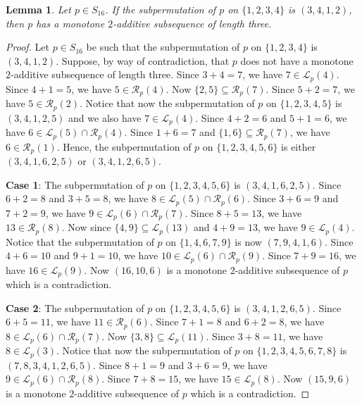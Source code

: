 \documentclass[11pt]{article}
\newtheorem{lemma}[theorem]{Lemma}
\theoremstyle{definition}
\begin{document}
\begin{lemma}\label{Lemma:Monotone3412}
Let $p\in S_{16}$. If the subpermutation of $p$ on $\{1,2,3,4\}$ is $(3,4,1,2)$, then $p$ has a monotone $2$-additive subsequence of length three.
\end{lemma}
\begin{proof}
    Let $p\in S_{16}$ be such that the subpermutation of $p$ on $\{1,2,3,4\}$ is $(3,4,1,2)$. Suppose, by way of contradiction, that $p$ does not have a monotone $2$-additive subsequence of length three. Since $3+4=7$, we have $7\in\mathcal{L}_p(4)$. Since $4+1=5$, we have $5\in\mathcal{R}_p(4)$. Now $\{2,5\}\subseteq\mathcal{R}_p(7)$. Since $5+2=7$, we have $5\in\mathcal{R}_p(2)$. Notice that now the subpermutation of $p$ on $\{1,2,3,4,5\}$ is $(3,4,1,2,5)$ and we also have $7\in\mathcal{L}_p(4)$. Since $4+2=6$ and $5+1=6$, we have $6\in\mathcal{L}_p(5)\cap\mathcal{R}_p(4)$. Since $1+6=7$ and $\{1,6\}\subseteq\mathcal{R}_p(7)$, we have $6\in\mathcal{R}_p(1)$. Hence, the subpermutation of $p$ on $\{1,2,3,4,5,6\}$ is either $(3,4,1,6,2,5)$ or $(3,4,1,2,6,5)$.

    {\bf Case 1}: The subpermutation of $p$ on $\{1,2,3,4,5,6\}$ is $(3,4,1,6,2,5)$. Since $6+2=8$ and $3+5=8$, we have $8\in\mathcal{L}_p(5)\cap\mathcal{R}_p(6)$. Since $3+6=9$ and $7+2=9$, we have $9\in\mathcal{L}_p(6)\cap\mathcal{R}_p(7)$. Since $8+5=13$, we have $13\in\mathcal{R}_p(8)$. Now since $\{4,9\}\subseteq\mathcal{L}_p(13)$ and $4+9=13$, we have $9\in\mathcal{L}_p(4)$. Notice that the subpermutation of $p$ on $\{1,4,6,7,9\}$ is now $(7,9,4,1,6)$. Since $4+6=10$ and $9+1=10$, we have $10\in\mathcal{L}_p(6)\cap\mathcal{R}_p(9)$. Since $7+9=16$, we have $16\in\mathcal{L}_p(9)$. Now $(16,10,6)$ is a monotone $2$-additive subsequence of $p$ which is a contradiction.

    {\bf Case 2}: The subpermutation of $p$ on $\{1,2,3,4,5,6\}$ is $(3,4,1,2,6,5)$. Since $6+5=11$, we have $11\in\mathcal{R}_p(6)$. Since $7+1=8$ and $6+2=8$, we have $8\in\mathcal{L}_p(6)\cap\mathcal{R}_p(7)$. Now $\{3,8\}\subseteq\mathcal{L}_p(11)$. Since $3+8=11$, we have $8\in\mathcal{L}_p(3)$. Notice that now the subpermutation of $p$ on $\{1,2,3,4,5,6,7,8\}$ is $(7,8,3,4,1,2,6,5)$. Since $8+1=9$ and $3+6=9$, we have $9\in\mathcal{L}_p(6)\cap\mathcal{R}_p(8)$. Since $7+8=15$, we have $15\in\mathcal{L}_p(8)$. Now $(15,9,6)$ is a monotone $2$-additive subsequence of $p$ which is a contradiction.
\end{proof}
\end{document}
